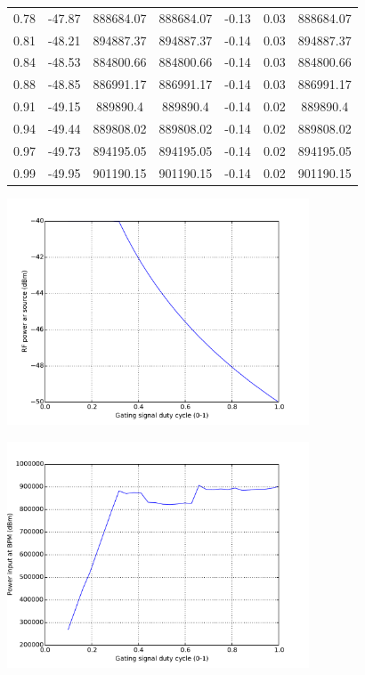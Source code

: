 \documentclass[a4paper, 11pt]{article}%
\begin{document}
\begin{figure}[htbp]
\begin{tabular}{|c|c|c|c|c|c|c|}
0.78&{-}47.87&888684.07&888684.07&{-}0.13&0.03&888684.07\\%
0.81&{-}48.21&894887.37&894887.37&{-}0.14&0.03&894887.37\\%
0.84&{-}48.53&884800.66&884800.66&{-}0.14&0.03&884800.66\\%
0.88&{-}48.85&886991.17&886991.17&{-}0.14&0.03&886991.17\\%
0.91&{-}49.15&889890.4&889890.4&{-}0.14&0.02&889890.4\\%
0.94&{-}49.44&889808.02&889808.02&{-}0.14&0.02&889808.02\\%
0.97&{-}49.73&894195.05&894195.05&{-}0.14&0.02&894195.05\\%
0.99&{-}49.95&901190.15&901190.15&{-}0.14&0.02&901190.15\\%
\hline%
\end{tabular}%
\end{figure}%


\begin{figure}[htbp]%
\centering%
\includegraphics[width=0.8\textwidth]{./Results/scaled_DC_vs_Out_power.pdf}%
\caption{}%
\end{figure}

%


\begin{figure}[htbp]%
\centering%
\includegraphics[width=0.8\textwidth]{./Results/scaled_DC_vs_In_power.pdf}%
\caption{}%
\end{figure}
\end{document}
